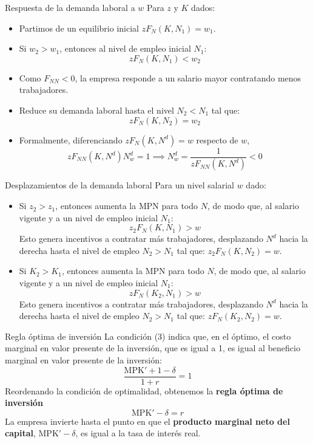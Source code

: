 \documentclass[aspectratio=169,11pt]{beamer}
\begin{document}
\begin{frame}{Respuesta de la demanda laboral a $w$}
  \small 
  Para $z$ y $K$ dados:
  \begin{itemize}
    \item Partimos de un equilibrio inicial $zF_N(K,N_1) = w_1$.
    \item Si $w_2 > w_1$, entonces al nivel de empleo inicial $N_1$:
    $$
      zF_N(K,N_1) <  w_2
    $$
    \item Como \(F_{NN}<0\), la empresa responde a un salario mayor contratando menos trabajadores.
    \item Reduce su demanda laboral hasta el nivel $N_2<N_1$ tal que: 
    $$
      zF_N(K,N_2) =  w_2
    $$
    \item Formalmente, diferenciando \(zF_N(K,N^d)=w\) respecto de \(w\),
        \[
          zF_{NN}(K,N^d)N^d_w=1
          \implies 
          \boxed{
          N^d_w
          =
          \frac{1}{zF_{NN}(K,N^d)}<0
          }
        \]
  \end{itemize}
\end{frame}




\begin{frame}{Desplazamientos de la demanda laboral}
  \small
  Para un nivel salarial $w$ dado:
  \begin{itemize}
    \setlength{\itemsep}{0.5em}
    \item Si $z_2>z_1$, entonces aumenta la $\mathrm{MPN}$ para todo $N$, de modo que, al salario vigente y a un nivel de empleo inicial $N_1$:
    $$
    z_2F_N(K, N_1) > w
    $$
    Esto genera incentivos a contratar más trabajadores, desplazando $N^d$ hacia la derecha hasta el nivel de empleo $N_2>N_1$ tal que: $z_2F_N(K, N_2) = w$.
    \item Si $K_2>K_1$, entonces aumenta la $\mathrm{MPN}$ para todo $N$, de modo que, al salario vigente y a un nivel de empleo inicial $N_1$:
    $$
    zF_N(K_2, N_1) > w
    $$
    Esto genera incentivos a contratar más trabajadores, desplazando $N^d$ hacia la derecha hasta el nivel de empleo $N_2>N_1$ tal que: $zF_N(K_2, N_2) = w$.
  \end{itemize}
\end{frame}

\begin{frame}[label=reglainversion]{Regla óptima de inversión}
  La condición (3) indica que, en el óptimo, el costo marginal en valor presente de la inversión, que es igual a 1, es igual al beneficio marginal en valor presente de la inversión:
  \[
  \boxed{
    \frac{\mathrm{MPK'} + 1-\delta}{1+r} = 1
  }
  \]
  Reordenando la condición de optimalidad, obtenemos la \textbf{regla óptima de inversión}
  \[
  \boxed{
    \mathrm{MPK'} -\delta = r
  }
  \] 
  La empresa invierte hasta el punto en que el \textbf{producto marginal neto del capital}, $\mathrm{MPK'} - \delta$, es igual a la tasa de interés real.

  \hyperlink{apendice-inversion}{
  }
\end{frame}
\end{document}
